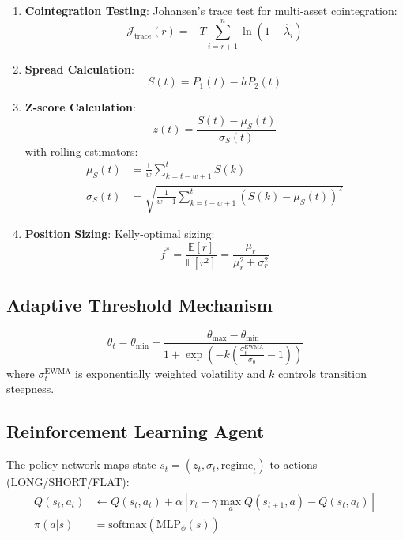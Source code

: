 \documentclass[article]{arithmaxresearch}
\begin{document}
\begin{enumerate}
    \item \textbf{Cointegration Testing}: Johansen's trace test for multi-asset cointegration:
    \begin{equation}
    \mathcal{J}_{\text{trace}}(r) = -T \sum_{i=r+1}^n \ln(1 - \hat{\lambda}_i)
    \end{equation}
    
    \item \textbf{Spread Calculation}:
    \begin{equation}
    S(t) = P_1(t) - hP_2(t)
    \end{equation}
    
    \item \textbf{Z-score Calculation}:
    \begin{equation}
    z(t) = \frac{S(t) - \mu_S(t)}{\sigma_S(t)}
    \end{equation}
    with rolling estimators:
    \begin{align}
    \mu_S(t) &= \frac{1}{w} \sum_{k=t-w+1}^t S(k) \\
    \sigma_S(t) &= \sqrt{\frac{1}{w-1} \sum_{k=t-w+1}^t (S(k) - \mu_S(t))^2}
    \end{align}
    
    \item \textbf{Position Sizing}: Kelly-optimal sizing:
    \begin{equation}
    f^* = \frac{\mathbb{E}[r]}{\mathbb{E}[r^2]} = \frac{\mu_r}{\mu_r^2 + \sigma_r^2}
    \end{equation}
\end{enumerate}

\subsection{Adaptive Threshold Mechanism}
\begin{equation}
\theta_t = \theta_{\min} + \frac{\theta_{\max} - \theta_{\min}}{1 + \exp\left(-k\left(\frac{\sigma_t^{\text{EWMA}}}{\sigma_0} - 1\right)\right)}
\end{equation}
where $\sigma_t^{\text{EWMA}}$ is exponentially weighted volatility and $k$ controls transition steepness.

\subsection{Reinforcement Learning Agent}
The policy network maps state $s_t = (z_t, \sigma_t, \text{regime}_t)$ to actions (LONG/SHORT/FLAT):
\begin{align}
Q(s_t,a_t) &\leftarrow Q(s_t,a_t) + \alpha \left[ r_t + \gamma \max_a Q(s_{t+1},a) - Q(s_t,a_t) \right] \\
\pi(a|s) &= \text{softmax}\left( \text{MLP}_{\phi}(s) \right)
\end{align}
\end{document}
